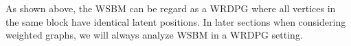 As shown above, the WSBM can be regard as a WRDPG where all vertices in the same block have identical latent positions. In later sections when considering weighted graphs, we will always analyze WSBM in a WRDPG setting.

















